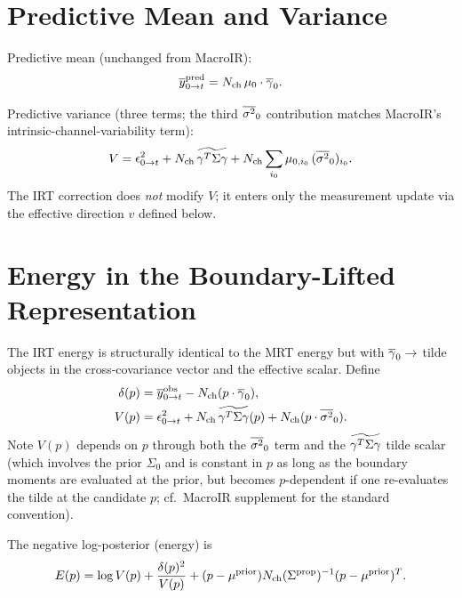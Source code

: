 \documentclass[11pt]{article}
\begin{document}
\section{Predictive Mean and Variance}

Predictive mean (unchanged from MacroIR):
\begin{equation}
  \overline{y}^{\mathrm{pred}}_{0\to t}
  = N_{\mathrm{ch}}\,\mu_0\cdot\overline{\gamma}_0.
  \label{eq:ypred}
\end{equation}

Predictive variance (three terms; the third $\overline{\sigma^2}_0$ contribution
matches MacroIR's intrinsic-channel-variability term):
\begin{equation}
  V
  = \epsilon^2_{0\to t}
  + N_{\mathrm{ch}}\,\widetilde{\gamma^{T}\Sigma\gamma}
  + N_{\mathrm{ch}}\sum_{i_0}\mu_{0,i_0}\,(\overline{\sigma^2}_0)_{i_0}.
  \label{eq:V}
\end{equation}
The IRT correction does \emph{not} modify $V$; it enters only the
measurement update via the effective direction $v$ defined below.

\section{Energy in the Boundary-Lifted Representation}

The IRT energy is structurally identical to the MRT energy but with
$\overline{\gamma}_0\to$ tilde objects in the cross-covariance vector and the
effective scalar. Define
\begin{align}
  \delta(p) &= \overline{y}^{\mathrm{obs}}_{0\to t} - N_{\mathrm{ch}}(p\cdot\overline{\gamma}_0),\\
  V(p)      &= \epsilon^2_{0\to t} + N_{\mathrm{ch}}\,\widetilde{\gamma^{T}\Sigma\gamma}(p) + N_{\mathrm{ch}}(p\cdot\overline{\sigma^2}_0).
\end{align}
Note $V(p)$ depends on $p$ through both the $\overline{\sigma^2}_0$ term and the
$\widetilde{\gamma^{T}\Sigma\gamma}$ tilde scalar (which involves the prior $\Sigma_0$ and is
constant in $p$ as long as the boundary moments are evaluated at the
prior, but becomes $p$-dependent if one re-evaluates the tilde at the
candidate $p$; cf.\ MacroIR supplement for the standard convention).

The negative log-posterior (energy) is
\begin{equation}
  E(p) = \log V(p) + \frac{\delta(p)^2}{V(p)}
  + (p-\mu^{\mathrm{prior}})N_{\mathrm{ch}}(\Sigma^{\mathrm{prop}})^{-1}(p-\mu^{\mathrm{prior}})^{T}.
  \label{eq:E}
\end{equation}
\end{document}
